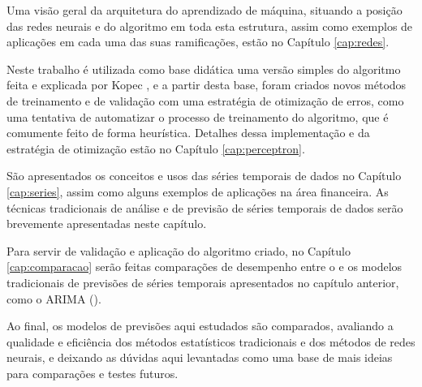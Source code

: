 Uma visão geral da arquitetura do aprendizado de máquina, situando a posição das redes neurais e do algoritmo  em toda esta estrutura, assim como exemplos de aplicações em cada uma das suas ramificações, estão no Capítulo \ref{cap:redes}.

Neste trabalho é utilizada como base didática uma versão simples do algoritmo  feita e explicada por Kopec \citep{classic}, e a partir desta base, foram criados novos métodos de treinamento e de validação com uma estratégia de otimização de erros, como uma tentativa de automatizar o processo de treinamento do algoritmo, que é comumente feito de forma heurística. Detalhes dessa implementação e da estratégia de otimização estão no Capítulo \ref{cap:perceptron}.

São apresentados os conceitos e usos das séries temporais de dados no Capítulo \ref{cap:series}, assim como alguns exemplos de aplicações na área financeira. As técnicas tradicionais de análise e de previsão de séries temporais de dados serão brevemente apresentadas neste capítulo.

Para servir de validação e aplicação do algoritmo criado, no Capítulo \ref{cap:comparacao} serão feitas comparações de desempenho entre o  e os modelos tradicionais de previsões de séries temporais apresentados no capítulo anterior, como o ARIMA ().

Ao final, os modelos de previsões aqui estudados são comparados, avaliando a qualidade e eficiência dos métodos estatísticos tradicionais e dos métodos de redes neurais, e deixando as dúvidas aqui levantadas como uma base de mais ideias para comparações e testes futuros.

